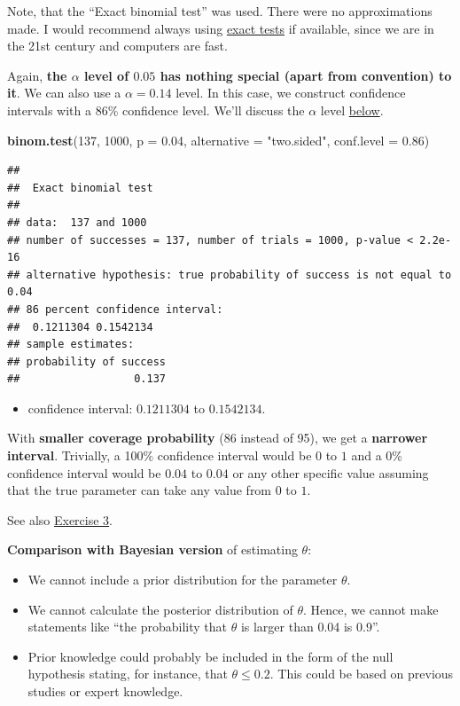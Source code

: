 \documentclass[
]{book}
\newenvironment{Shaded}{\begin{snugshade}}{\end{snugshade}}
\newcommand{\AttributeTok}[1]{\textcolor[rgb]{0.13,0.29,0.53}{#1}}
\newcommand{\DecValTok}[1]{\textcolor[rgb]{0.00,0.00,0.81}{#1}}
\newcommand{\FloatTok}[1]{\textcolor[rgb]{0.00,0.00,0.81}{#1}}
\newcommand{\FunctionTok}[1]{\textcolor[rgb]{0.13,0.29,0.53}{\textbf{#1}}}
\newcommand{\NormalTok}[1]{#1}
\newcommand{\StringTok}[1]{\textcolor[rgb]{0.31,0.60,0.02}{#1}}
\providecommand{\tightlist}{%
  \setlength{\itemsep}{0pt}\setlength{\parskip}{0pt}}
\begin{document}
Note, that the ``Exact binomial test'' was used. There were no approximations made. I would recommend always
using \href{https://en.wikipedia.org/wiki/Exact_test}{exact tests} if available, since we are in the 21st century and computers are fast.

Again, \textbf{the \(\alpha\) level of \(0.05\) has nothing special (apart from convention) to it}.
We can also use a \(\alpha = 0.14\) level. In this case, we construct confidence intervals
with a 86\% confidence level. We'll discuss the \(\alpha\) level \hyperref[error_types]{below}.

\begin{Shaded}
\begin{Highlighting}[]
\FunctionTok{binom.test}\NormalTok{(}\DecValTok{137}\NormalTok{, }\DecValTok{1000}\NormalTok{, }\AttributeTok{p =} \FloatTok{0.04}\NormalTok{, }\AttributeTok{alternative =} \StringTok{"two.sided"}\NormalTok{, }\AttributeTok{conf.level =} \FloatTok{0.86}\NormalTok{)}
\end{Highlighting}
\end{Shaded}

\begin{verbatim}
## 
##  Exact binomial test
## 
## data:  137 and 1000
## number of successes = 137, number of trials = 1000, p-value < 2.2e-16
## alternative hypothesis: true probability of success is not equal to 0.04
## 86 percent confidence interval:
##  0.1211304 0.1542134
## sample estimates:
## probability of success 
##                  0.137
\end{verbatim}

\begin{itemize}
\tightlist
\item
  confidence interval: \(0.1211304\) to \(0.1542134\).
\end{itemize}

With \textbf{smaller coverage probability} (86 instead of 95), we get a \textbf{narrower interval}.
Trivially, a 100\% confidence interval would be \(0\) to \(1\) and a 0\% confidence interval would be \(0.04\) to \(0.04\) or any other
specific value assuming that the true parameter can take any value from \(0\) to \(1\).

See also \hyperref[exercise3_nhst]{Exercise 3}.

\textbf{Comparison with Bayesian version} of estimating \(\theta\):

\begin{itemize}
\tightlist
\item
  We cannot include a prior distribution for the parameter \(\theta\).
\item
  We cannot calculate the posterior distribution of \(\theta\).
  Hence, we cannot make statements like ``the probability that \(\theta\) is larger than 0.04 is 0.9''.
\item
  Prior knowledge could probably be included in the form of the null hypothesis stating, for instance, that \(\theta \le 0.2\).
  This could be based on previous studies or expert knowledge.
\end{itemize}
\end{document}
